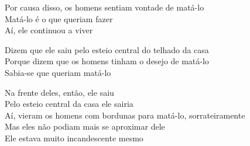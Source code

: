 \bigskip

\begin{linenumbers}\begingroup\raggedright
\noindent Por causa disso, os homens sentiam vontade de matá-lo\\
Matá-lo é o que queriam fazer\\
Aí, ele continuou a viver
\end{linenumbers}\endgroup

\bigskip

\begin{linenumbers}\begingroup\raggedright
\noindent Dizem que ele saiu pelo esteio central do telhado da casa\\
Porque dizem que os homens tinham o desejo de matá-lo\\
Sabia-se que queriam matá-lo
\end{linenumbers}\endgroup

\bigskip

\begin{linenumbers}\begingroup\raggedright
\noindent Na frente deles, então, ele saiu\\
Pelo esteio central da casa ele sairia\\
Aí, vieram os homens com bordunas para matá-lo, sorrateiramente\\
Mas eles não podiam mais se aproximar dele\\
Ele estava muito incandescente mesmo
\end{linenumbers}\endgroup

\bigskip

